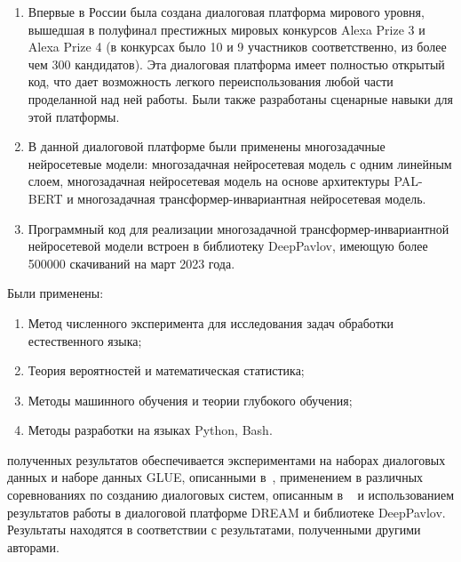 {\influence}
\begin{enumerate}
   \item Впервые в России была создана диалоговая платформа мирового уровня, вышедшая в полуфинал престижных мировых конкурсов Alexa Prize 3 и Alexa Prize 4 (в конкурсах было 10 и 9 участников соответственно, из более чем 300 кандидатов). Эта диалоговая платформа имеет полностью открытый код, что дает возможность легкого переиспользования любой части проделанной над ней работы. Были также разработаны сценарные навыки для этой платформы.
   \item В данной диалоговой платформе были применены многозадачные нейросетевые модели: многозадачная нейросетевая модель с одним линейным слоем, многозадачная нейросетевая модель на основе архитектуры PAL-BERT и многозадачная трансформер-инвариантная нейросетевая модель.
   \item Программный код для реализации многозадачной трансформер-инвариантной нейросетевой модели встроен в библиотеку DeepPavlov, имеющую более 500000 скачиваний на март 2023 года.
\end{enumerate}

{\methods}
Были применены: %
\begin{enumerate}
\item Метод численного эксперимента для исследования задач обработки естественного языка;
\item Теория вероятностей и математическая статистика;
\item Методы машинного обучения и теории глубокого обучения;
\item Методы разработки на языках Python, Bash.
\end{enumerate}

{\reliability} полученных результатов обеспечивается экспериментами на наборах диалоговых данных и наборе данных GLUE, описанными в~\cite{pseudolabel,rumtl,enmtl,rutopics}, применением в различных соревнованиях по созданию диалоговых систем, описанным в ~\cite{dream1,dream2,dream1_trudy,Болотин_Карпов_Рашков_Шкурак_2019} и использованием результатов работы в диалоговой платформе DREAM и библиотеке DeepPavlov. Результаты находятся в соответствии с результатами, полученными другими авторами.

